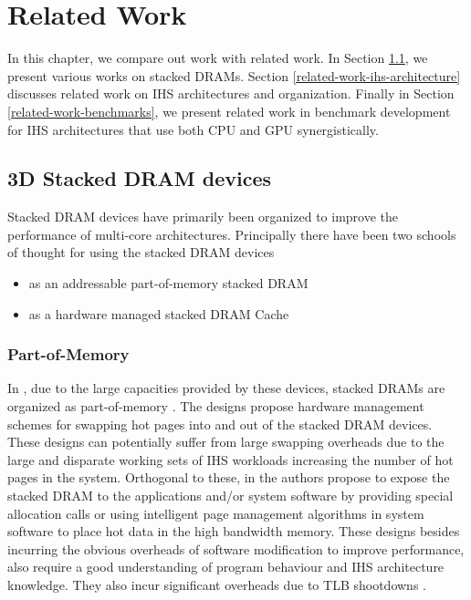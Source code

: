 \chapter{Related Work} \label{chap:related-work}
In this chapter, we compare out work with related work. In Section \ref{related-work-stacked-dram}, we present various works on stacked DRAMs. Section \ref{related-work-ihs-architecture} discusses related work on IHS architectures and organization. Finally in Section \ref{related-work-benchmarks}, we present related work in benchmark development for IHS architectures that use both CPU and GPU synergistically.
\section{3D Stacked DRAM devices} \label{related-work-stacked-dram}
Stacked DRAM devices have primarily been organized to improve the performance of multi-core architectures. Principally there have been two schools of thought for using the stacked DRAM devices 
\begin{itemize}
	\item as an addressable part-of-memory stacked DRAM 
	\item as a hardware managed stacked DRAM Cache
\end{itemize}
\subsection{Part-of-Memory}
In \cite{pom,cameo}, due to the large capacities provided by these devices, stacked DRAMs are organized as part-of-memory . The designs propose hardware management schemes for swapping hot pages into and out of the stacked DRAM devices. These designs can potentially suffer from large swapping overheads due to the large and disparate working sets of IHS workloads increasing the number of hot pages in the system. Orthogonal to these, in \cite{software-dram} the authors propose to expose the stacked DRAM to the applications and/or system software by providing special allocation calls or using intelligent page management algorithms in system software to place hot data in the high bandwidth memory. These designs besides incurring the obvious overheads of software modification to improve performance,  also require a good understanding of program behaviour and IHS architecture knowledge. They also incur significant overheads due to TLB shootdowns \cite{software-dram}.
